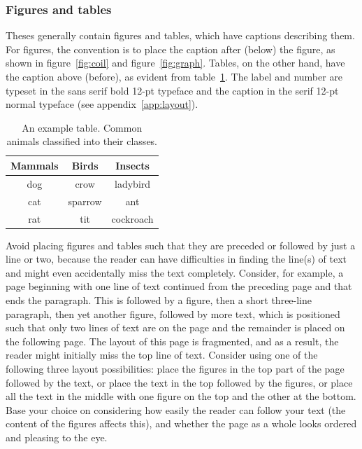 \documentclass[english, 12pt, a4paper, biz, utf8, a-2b, online]{aaltothesis}
\begin{document}
\subsubsection{Figures and tables}

Theses generally contain figures and tables, which have captions describing 
them. For figures, the convention is to place the caption after (below) the 
figure, as shown in figure~\ref{fig:coil} and figure~\ref{fig:graph}. Tables, on
the other hand, have the caption above (before), as evident from 
table~\ref{tab:animals}. The label and number are typeset in the sans serif bold
12-pt typeface and the caption in the serif 12-pt normal typeface (see 
appendix~\ref{app:layout}).

\begin{table}[tb]
	\centering
	\caption{An example table. Common animals classified into their classes.}
	\label{tab:animals}
	\sffamily%
	\begin{tabular}{ccc}
	  \hline
	  \textbf{Mammals} & \textbf{Birds} & \textbf{Insects}\\ \hline
	  dog & crow & ladybird \\ \hline
	  cat & sparrow & ant \\ \hline
	  rat & tit & cockroach \\ \hline
	\end{tabular}
\end{table}

Avoid placing figures and tables such that they are preceded or followed by just
a line or two, because the reader can have difficulties in finding the line(s) 
of text and might even accidentally miss the text completely. Consider, for 
example, a page beginning with one line of text continued from the preceding 
page and that ends the paragraph. This is followed by a figure, then a short 
three-line paragraph, then yet another figure, followed by more text, which is 
positioned such that only two lines of text are on the page and the remainder is
placed on the following page. The layout of this page is fragmented, and as a 
result, the reader might initially miss the top line of text. Consider using one
of the following three layout possibilities: place the figures in the top part 
of the page followed by the text, or place the text in the top followed by the 
figures, or place all the text in the middle with one figure on the top and the 
other at the bottom. Base your choice on considering how easily the reader can 
follow your text (the content of the figures affects this), and whether the page
as a whole looks ordered and pleasing to the eye.
\end{document}
